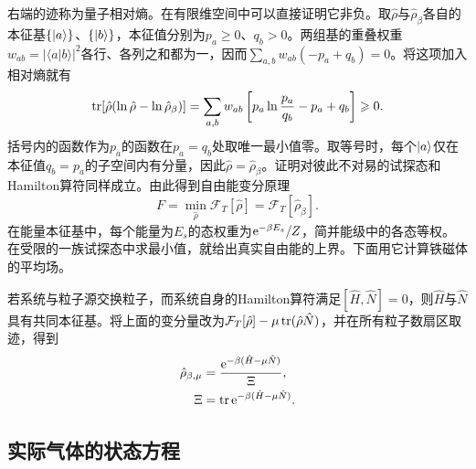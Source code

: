 右端的迹称为量子相对熵。在有限维空间中可以直接证明它非负。取$\hat\rho$与$\hat\rho_\beta$各自的本征基$\{\lvert a\rangle\}$、$\{\lvert b\rangle\}$，本征值分别为$p_a \geqslant 0$、$q_b > 0$。两组基的重叠权重$w_{ab} = |\langle a|b\rangle|^2$各行、各列之和都为一，因而$\textstyle \sum_{a,b}w_{ab}(-p_a + q_b) = 0$。将这项加入相对熵就有
\[
	\operatorname{tr}\!\left[\hat\rho(\ln\hat\rho - \ln\hat\rho_\beta)\right]
	= \sum_{a,b}w_{ab}\left[p_a\ln\frac{p_a}{q_b} - p_a + q_b\right] \geqslant 0.
\]
括号内的函数作为$p_a$的函数在$p_a = q_b$处取唯一最小值零。取等号时，每个$\lvert a\rangle$仅在本征值$q_b = p_a$的子空间内有分量，因此$\hat\rho = \hat\rho_\beta$。证明对彼此不对易的试探态和Hamilton算符同样成立。由此得到自由能变分原理
\begin{equation}
	\label{eq:sm-gibbs-variational-principle}
	F = \min_{\hat\rho}\mathcal F_T[\hat\rho] = \mathcal F_T[\hat\rho_\beta].
\end{equation}
在能量本征基中，每个能量为$E_s$的态权重为$\mathop{}\!\mathrm{e}^{-\beta E_s}/Z$，简并能级中的各态等权。在受限的一族试探态中求最小值，就给出真实自由能的上界。下面用它计算铁磁体的平均场。

若系统与粒子源交换粒子，而系统自身的Hamilton算符满足$[\hat H,\hat N] = 0$，则$\hat H$与$\hat N$具有共同本征基。将上面的变分量改为$\mathcal F_T[\hat\rho] - \mu\operatorname{tr}(\hat\rho\hat N)$，并在所有粒子数扇区取迹，得到
\begin{subequations}
	\label{eq:sm-grand-canonical-density-operator}
	\begin{align}
		\hat\rho_{\beta,\mu} &= \frac{\mathop{}\!\mathrm{e}^{-\beta(\hat H-\mu\hat N)}}{\Xi},\\
		\Xi &= \operatorname{tr}\mathop{}\!\mathrm{e}^{-\beta(\hat H-\mu\hat N)}.
	\end{align}
\end{subequations}

\subsection{实际气体的状态方程}


